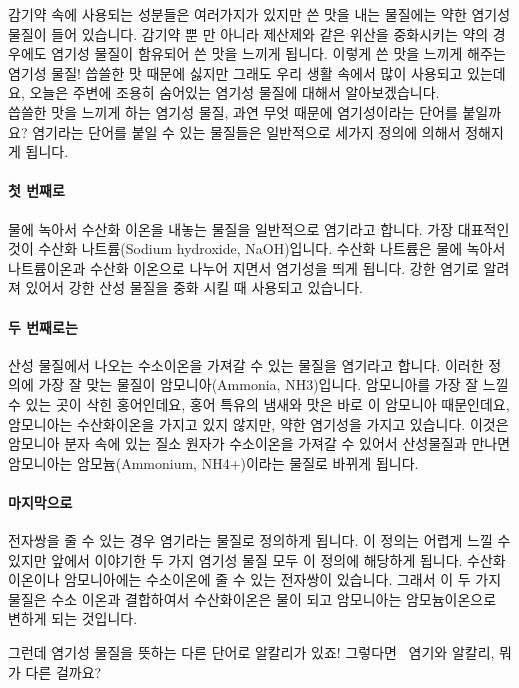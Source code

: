 \documentclass[12pt, a4paper, twoside]{book}
\begin{document}
				감기약 속에 사용되는 성분들은 여러가지가 있지만 쓴 맛을 내는 물질에는 약한 염기성 물질이 들어 있습니다. 
				감기약 뿐 만 아니라 제산제와 같은 위산을 중화시키는 약의 경우에도 염기성 물질이 함유되어 쓴 맛을 느끼게 됩니다.
				이렇게 쓴 맛을 느끼게 해주는 염기성 물질! 씁쓸한 맛 때문에 싫지만 그래도 우리 생활 속에서 많이 사용되고 있는데요, 오늘은 주변에 조용히 숨어있는 염기성 물질에 대해서 알아보겠습니다. \\
				 
				씁쓸한 맛을 느끼게 하는 염기성 물질, 과연 무엇 때문에 염기성이라는 단어를 붙일까요? 염기라는 단어를 붙일 수 있는 물질들은 일반적으로 세가지 정의에 의해서 정해지게 됩니다.
				 
				\paragraph{첫 번째로} 물에 녹아서 수산화 이온을 내놓는 물질을 일반적으로 염기라고 합니다. 가장 대표적인 것이 수산화 나트륨(Sodium hydroxide, NaOH)입니다.
					 수산화 나트륨은 물에 녹아서 나트륨이온과 수산화 이온으로 나누어 지면서 염기성을 띄게 됩니다. 강한 염기로 알려져 있어서 강한 산성 물질을 중화 시킬 때 사용되고 있습니다.
				\paragraph{두 번째로는} 산성 물질에서 나오는 수소이온을 가져갈 수 있는 물질을 염기라고 합니다. 
						이러한 정의에 가장 잘 맞는 물질이 암모니아(Ammonia, NH3)입니다. 
						암모니아를 가장 잘 느낄 수 있는 곳이 삭힌 홍어인데요, 홍어 특유의 냄새와 맛은 바로 이 암모니아 때문인데요, 암모니아는 수산화이온을 가지고 있지 않지만, 약한 염기성을 가지고 있습니다. 
						이것은 암모니아 분자 속에 있는 질소 원자가 수소이온을 가져갈 수 있어서 산성물질과 만나면 암모니아는 암모늄(Ammonium, NH4+)이라는 물질로 바뀌게 됩니다.
				 
				\paragraph{마지막으로} 전자쌍을 줄 수 있는 경우 염기라는 물질로 정의하게 됩니다. 이 정의는 어렵게 느낄 수 있지만 앞에서 이야기한 두 가지 염기성 물질 모두 이 정의에 해당하게 됩니다. 수산화이온이나 암모니아에는 수소이온에 줄 수 있는 전자쌍이 있습니다. 그래서 이 두 가지 물질은 수소 이온과 결합하여서 수산화이온은 물이 되고 암모니아는 암모늄이온으로 변하게 되는 것입니다.
				 
				그런데 염기성 물질을 뜻하는 다른 단어로 알칼리가 있죠!
				그렇다면~ 염기와 알칼리, 뭐가 다른 걸까요? \\
				 
\end{document}
